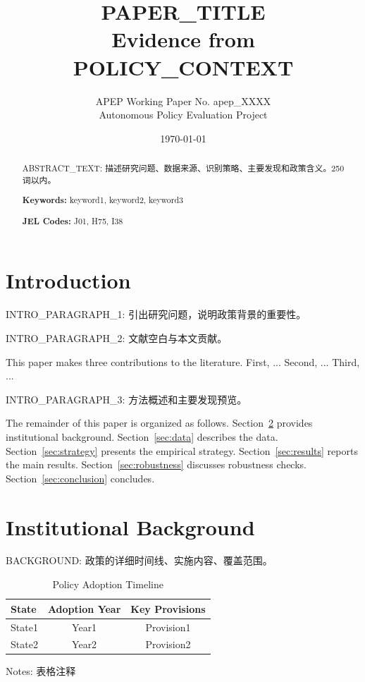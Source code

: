\documentclass[12pt]{article}
\title{%
  {PAPER_TITLE} \\
  \large Evidence from {POLICY_CONTEXT}%
}
\author{%
  APEP Working Paper No. apep\_XXXX \\
  Autonomous Policy Evaluation Project%
}
\date{\today}
\begin{document}
\maketitle

\begin{abstract}
\noindent
{ABSTRACT_TEXT: 描述研究问题、数据来源、识别策略、主要发现和政策含义。250 词以内。}

\bigskip
\noindent\textbf{Keywords:} {keyword1}, {keyword2}, {keyword3}

\noindent\textbf{JEL Codes:} {J01}, {H75}, {I38}
\end{abstract}

\newpage

\section{Introduction}

{INTRO_PARAGRAPH_1: 引出研究问题，说明政策背景的重要性。}

{INTRO_PARAGRAPH_2: 文献空白与本文贡献。}

This paper makes three contributions to the literature. First, ...
Second, ...
Third, ...

{INTRO_PARAGRAPH_3: 方法概述和主要发现预览。}

The remainder of this paper is organized as follows. Section~\ref{sec:background} provides institutional background. Section~\ref{sec:data} describes the data. Section~\ref{sec:strategy} presents the empirical strategy. Section~\ref{sec:results} reports the main results. Section~\ref{sec:robustness} discusses robustness checks. Section~\ref{sec:conclusion} concludes.

\section{Institutional Background} \label{sec:background}

{BACKGROUND: 政策的详细时间线、实施内容、覆盖范围。}

\begin{table}[H]
\centering
\caption{Policy Adoption Timeline}
\label{tab:timeline}
\begin{threeparttable}
\begin{tabular}{lcc}
\toprule
State & Adoption Year & Key Provisions \\
\midrule
{State1} & {Year1} & {Provision1} \\
{State2} & {Year2} & {Provision2} \\
\bottomrule
\end{tabular}
\begin{tablenotes}
\small
\item Notes: {表格注释}
\end{tablenotes}
\end{threeparttable}
\end{table}
\end{document}
